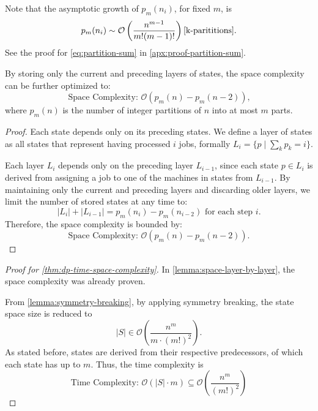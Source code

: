 Note that the asymptotic growth of $p_m(n_i)$, for fixed $m$, is
\[
    p_m(n_i) \sim \mathcal{O}\left( \frac{n^{m - 1}}{m!(m-1)!} \right) \cite{k-parititions}\text{.}
\]
See the proof for \autoref{eq:partition-sum} in \ref{apx:proof-partition-sum}.

\begin{lemma}
    \label{lemma:space-layer-by-layer}
    By storing only the current and preceding layers of states, the space complexity can be further optimized to:
    \[
        \text{Space Complexity: } \mathcal{O}\left( p_m(n) - p_m(n-2) \right)\text{,}
    \]
    where $p_m(n)$ is the number of integer partitions of $n$ into at most $m$ parts.
\end{lemma}

\begin{proof}
    Each state depends only on its preceding states. We define a layer of states as all states that represent having processed $i$ jobs, formally $L_i = \{ p \mid \sum_k p_k = i \}$.

    Each layer $L_i$ depends only on the preceding layer $L_{i-1}$, since each state $p \in L_i$ is derived from assigning a job to one of the machines in states from $L_{i-1}$. By maintaining only the current and preceding layers and discarding older layers, we limit the number of stored states at any time to:
    \[
        |L_i| + |L_{i-1}| = p_m(n_i) - p_m(n_{i-2}) \text{ for each step } i.
    \]
    Therefore, the space complexity is bounded by:
    \[
        \text{Space Complexity: } \mathcal{O}\left( p_m(n) - p_m(n-2) \right)\text{.}
    \]
\end{proof}

\begin{proof}[Proof for \autoref{thm:dp-time-space-complexity}]
    In \autoref{lemma:space-layer-by-layer}, the space complexity was already proven.

    From \autoref{lemma:symmetry-breaking}, by applying symmetry breaking, the state space size is reduced to
    \[
        |S| \in \mathcal{O}\left( \frac{n^m}{m \cdot (m!)^2} \right)\text{.}
    \]
    As stated before, states are derived from their respective predecessors, of which each state has up to $m$. Thus, the time complexity is
    \[
        \text{Time Complexity: } \mathcal{O}\left( |S| \cdot m \right) \subseteq \mathcal{O}\left( \frac{n^m}{(m!)^2} \right)
    \]
\end{proof}
